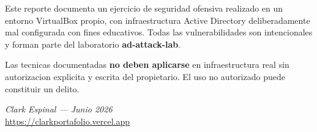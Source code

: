 \documentclass[11pt,a4paper]{article}
\begin{document}
\vspace{0.6cm}

\begin{tcolorbox}[colback=lightgray, colframe=bordercolor, boxrule=0.5pt, arc=3pt]
Este reporte documenta un ejercicio de seguridad ofensiva realizado en un
entorno VirtualBox propio, con infraestructura Active Directory deliberadamente
mal configurada con fines educativos. Todas las vulnerabilidades son intencionales
y forman parte del laboratorio \textbf{ad-attack-lab}.

Las tecnicas documentadas \textbf{no deben aplicarse} en infraestructura real
sin autorizacion explicita y escrita del propietario. El uso no autorizado puede
constituir un delito.

\vspace{0.3cm}
\textit{Clark Espinal --- Junio 2026}\\
\url{https://clarkportafolio.vercel.app}
\end{tcolorbox}
\end{document}
